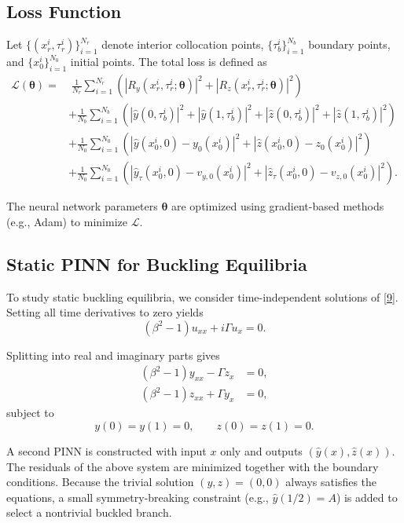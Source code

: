 \documentclass{article}
\begin{document}
\subsection{Loss Function}

Let $\{(x_r^i,\tau_r^i)\}_{i=1}^{N_r}$ denote interior collocation points, $\{\tau_b^i\}_{i=1}^{N_b}$ boundary points, and $\{x_0^i\}_{i=1}^{N_0}$ initial points. The total loss is defined as
\begin{align}
\mathcal{L}(\bm{\theta}) =
&\; \frac{1}{N_r}\sum_{i=1}^{N_r} \left( |R_y(x_r^i,\tau_r^i;\bm{\theta})|^2 + |R_z(x_r^i,\tau_r^i;\bm{\theta})|^2 \right) \\
&+ \frac{1}{N_b}\sum_{i=1}^{N_b} \left( |\hat{y}(0,\tau_b^i)|^2 + |\hat{y}(1,\tau_b^i)|^2
+ |\hat{z}(0,\tau_b^i)|^2 + |\hat{z}(1,\tau_b^i)|^2 \right) \\
&+ \frac{1}{N_0}\sum_{i=1}^{N_0} \left( |\hat{y}(x_0^i,0)-y_0(x_0^i)|^2 + |\hat{z}(x_0^i,0)-z_0(x_0^i)|^2 \right) \\
&+ \frac{1}{N_0}\sum_{i=1}^{N_0} \left( |\hat{y}_\tau(x_0^i,0)-v_{y,0}(x_0^i)|^2 + |\hat{z}_\tau(x_0^i,0)-v_{z,0}(x_0^i)|^2 \right).
\end{align}

The neural network parameters $\bm{\theta}$ are optimized using gradient-based methods (e.g., Adam) to minimize $\mathcal{L}$.

\subsection{Static PINN for Buckling Equilibria}

To study static buckling equilibria, we consider time-independent solutions of \eqref{9}. Setting all time derivatives to zero yields
\[
(\beta^2 - 1)u_{xx} + i\Gamma u_x = 0.
\]

Splitting into real and imaginary parts gives
\begin{align}
(\beta^2 - 1)y_{xx} - \Gamma z_x &= 0, \\
(\beta^2 - 1)z_{xx} + \Gamma y_x &= 0,
\end{align}
subject to
\[
y(0)=y(1)=0, \qquad z(0)=z(1)=0.
\]

A second PINN is constructed with input $x$ only and outputs $(\hat{y}(x),\hat{z}(x))$. The residuals of the above system are minimized together with the boundary conditions. Because the trivial solution $(y,z)=(0,0)$ always satisfies the equations, a small symmetry-breaking constraint (e.g., $\hat{y}(1/2)=A$) is added to select a nontrivial buckled branch.
\end{document}

